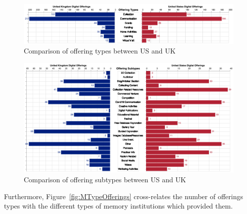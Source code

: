 \documentclass{egpubl}
\begin{document}
\begin{figure}[h]
  \centering
  \includegraphics[width=\linewidth]{images/typecomparison.png}
  \caption{\label{fig:TypeComparisonUKUS}
           Comparison of offering types between US and UK}
\end{figure}
\begin{figure}[h]
  \centering
  \includegraphics[width=\linewidth]{images/subtypecomparison.png}
  \caption{\label{fig:SubTypeComparisonUKUS}
           Comparison of offering subtypes between US and UK}
\end{figure}

 





Furthermore, Figure~\ref{fig:MTypeOfferings} cross-relates the number of offerings types with the different types of memory institutions which provided them. 
\end{document}
